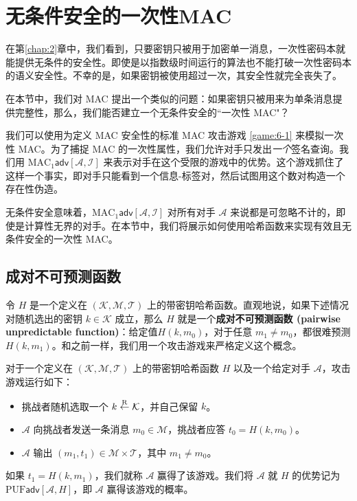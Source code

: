 \section{无条件安全的一次性MAC}\label{sec:7-6}

在第\ref{chap:2}章中，我们看到，只要密钥只被用于加密单一消息，一次性密码本就能提供无条件的安全性。即使是以指数级时间运行的算法也不能打破一次性密码本的语义安全性。不幸的是，如果密钥被使用超过一次，其安全性就完全丧失了。

在本节中，我们对 MAC 提出一个类似的问题：如果密钥只被用来为单条消息提供完整性，那么，我们能否建立一个无条件安全的``一次性 MAC"？

我们可以使用为定义 MAC 安全性的标准 MAC 攻击游戏 \ref{game:6-1} 来模拟一次性 MAC。为了捕捉 MAC 的一次性属性，我们允许对手只发出\emph{一个}签名查询。我们用 $\mathrm{MAC}_1\mathsf{adv}[\mathcal{A},\mathcal{I}]$ 来表示对手在这个受限的游戏中的优势。这个游戏抓住了这样一个事实，即对手只能看到一个信息-标签对，然后试图用这个数对构造一个存在性伪造。

无条件安全意味着，$\mathrm{MAC}_1\mathsf{adv}[\mathcal{A},\mathcal{I}]$ 对所有对手 $\mathcal{A}$ 来说都是可忽略不计的，即使是计算性无界的对手。在本节中，我们将展示如何使用哈希函数来实现有效且无条件安全的一次性 MAC。

\subsection{成对不可预测函数}\label{subsec:7-6-1}

令 $H$ 是一个定义在 $(\mathcal{K},\mathcal{M},\mathcal{T})$ 上的带密钥哈希函数。直观地说，如果下述情况对随机选出的密钥 $k\in\mathcal{K}$ 成立，那么 $H$ 就是一个\textbf{成对不可预测函数 (pairwise unpredictable function)}：给定值$H(k,m_0)$，对于任意 $m_1\neq m_0$，都很难预测 $H(k,m_1)$。和之前一样，我们用一个攻击游戏来严格定义这个概念。

\begin{game}[成对不可预测性]\label{game:7-5}
对于一个定义在 $(\mathcal{K},\mathcal{M},\mathcal{T})$ 上的带密钥哈希函数 $H$ 以及一个给定对手 $\mathcal{A}$，攻击游戏运行如下：
\begin{itemize}
	\item 挑战者随机选取一个 $k\overset{\rm R}\leftarrow\mathcal{K}$，并自己保留 $k$。
	\item $\mathcal{A}$ 向挑战者发送一条消息 $m_0\in\mathcal{M}$，挑战者应答 $t_0=H(k,m_0)$。
	\item $\mathcal{A}$ 输出 $(m_1,t_1)\in\mathcal{M}\times\mathcal{T}$，其中 $m_1\neq m_0$。
\end{itemize}
如果 $t_1=H(k,m_1)$，我们就称 $\mathcal{A}$ 赢得了该游戏。我们将 $\mathcal{A}$ 就 $H$ 的优势记为 $\mathrm{PUF}\mathsf{adv}[\mathcal{A},H]$，即 $\mathcal{A}$ 赢得该游戏的概率。
\end{game}

